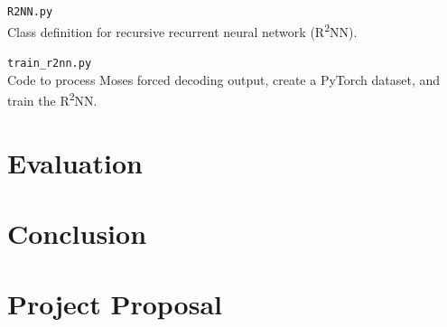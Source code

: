 \documentclass[12pt,a4paper,twoside,openright]{report}
\begin{document}
\texttt{R2NN.py}\\
Class definition for recursive recurrent neural network (R\textsuperscript{2}NN).

\texttt{train\_r2nn.py}\\
Code to process Moses forced decoding output, create a PyTorch dataset, and train the R\textsuperscript{2}NN.

\chapter{Evaluation}

\chapter{Conclusion}




\appendix

\chapter{Project Proposal}








% 
\end{document}
